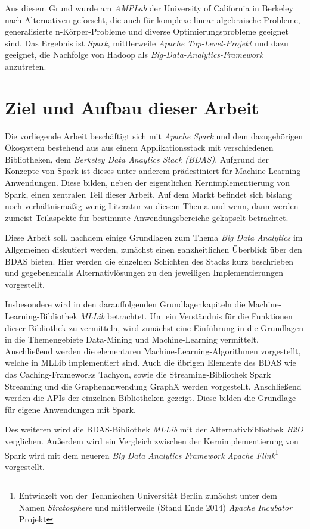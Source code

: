 Aus diesem Grund wurde am \textit{AMPLab} der University of California in Berkeley nach Alternativen geforscht, die auch für komplexe linear-algebraische Probleme, generalisierte n-Körper-Probleme und diverse Optimierungsprobleme geeignet sind. Das Ergebnis ist \textit{Spark}, mittlerweile \textit{Apache Top-Level-Projekt} und dazu geeignet, die Nachfolge von Hadoop als \textit{Big-Data-Analytics-Framework} anzutreten. 

\section{Ziel und Aufbau dieser Arbeit}
\label{section:ziel dieser Arbeit}

Die vorliegende Arbeit beschäftigt sich mit \textit{Apache Spark} und dem dazugehörigen Ökosystem bestehend aus aus einem Applikationsstack mit verschiedenen Bibliotheken, dem \textit{Berkeley Data Anaytics Stack (BDAS)}. Aufgrund der Konzepte von Spark ist dieses unter anderem prädestiniert für Machine-Learning-Anwendungen. Diese bilden, neben der eigentlichen Kernimplementierung von Spark, einen zentralen Teil dieser Arbeit.  Auf dem Markt befindet sich bislang noch verhältnismäßig wenig Literatur zu diesem Thema und wenn, dann werden zumeist Teilaspekte für bestimmte Anwendungsbereiche gekapselt betrachtet. 

Diese Arbeit soll, nachdem einige Grundlagen zum Thema \textit{Big Data Analytics} im Allgemeinen diskutiert werden, zunächst einen ganzheitlichen Überblick über den BDAS bieten. Hier werden die einzelnen Schichten des Stacks kurz beschrieben und gegebenenfalls Alternativlösungen zu den jeweiligen Implementierungen vorgestellt. 

Insbesondere wird in den darauffolgenden Grundlagenkapiteln die Machine-Learning-Bibliothek \textit{MLLib} betrachtet. Um ein Verständnis für die Funktionen dieser Bibliothek zu vermitteln, wird zunächst eine Einführung in die Grundlagen in die Themengebiete Data-Mining und Machine-Learning vermittelt. Anschließend werden die elementaren Machine-Learning-Algorithmen vorgestellt, welche in MLLib implementiert sind.  Auch die übrigen Elemente des BDAS wie das Caching-Frameworks Tachyon, sowie die Streaming-Bibliothek Spark Streaming und die Graphenanwendung GraphX werden vorgestellt. Anschließend werden die APIs der einzelnen Bibliotheken gezeigt. Diese bilden die Grundlage für eigene Anwendungen mit Spark. 

Des weiteren wird die BDAS-Bibliothek \textit{MLLib} mit der Alternativbibliothek \textit{H2O} verglichen. Außerdem wird ein Vergleich zwischen der Kernimplementierung von Spark wird mit dem neueren \textit{Big Data Analytics Framework} \textit{Apache Flink}\footnote{Entwickelt von der Technischen Universität Berlin zunächst unter dem Namen \textit{Stratosphere} und mittlerweile (Stand Ende 2014) \textit{Apache Incubator} Projekt} vorgestellt. 

